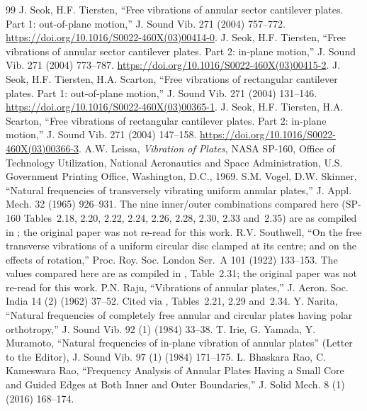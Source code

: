 \documentclass[11pt]{article}
\begin{document}
\begin{thebibliography}{99}\small
\setlength{\itemsep}{0pt}
\setlength{\parsep}{0pt}
 J. Seok, H.F. Tiersten, ``Free vibrations of annular sector
cantilever plates. Part 1: out-of-plane motion,'' J. Sound Vib. 271 (2004)
757--772. \url{https://doi.org/10.1016/S0022-460X(03)00414-0}.
 J. Seok, H.F. Tiersten, ``Free vibrations of annular sector
cantilever plates. Part 2: in-plane motion,'' J. Sound Vib. 271 (2004)
773--787. \url{https://doi.org/10.1016/S0022-460X(03)00415-2}.
 J. Seok, H.F. Tiersten, H.A. Scarton, ``Free vibrations of
rectangular cantilever plates. Part 1: out-of-plane motion,'' J. Sound
Vib. 271 (2004) 131--146. \url{https://doi.org/10.1016/S0022-460X(03)00365-1}.
 J. Seok, H.F. Tiersten, H.A. Scarton, ``Free vibrations of
rectangular cantilever plates. Part 2: in-plane motion,'' J. Sound Vib.
271 (2004) 147--158. \url{https://doi.org/10.1016/S0022-460X(03)00366-3}.
 A.W. Leissa, \emph{Vibration of Plates}, NASA SP-160,
Office of Technology Utilization, National Aeronautics and Space
Administration, U.S. Government Printing Office, Washington, D.C., 1969.
 S.M. Vogel, D.W. Skinner, ``Natural frequencies of
transversely vibrating uniform annular plates,'' J. Appl. Mech. 32 (1965)
926--931. The nine inner/outer combinations compared here (SP-160
Tables~2.18, 2.20, 2.22, 2.24, 2.26, 2.28, 2.30, 2.33 and~2.35) are as
compiled in \cite{leissaSP160}; the original paper was not re-read for
this work.
 R.V. Southwell, ``On the free transverse vibrations of a
uniform circular disc clamped at its centre; and on the effects of rotation,''
Proc. Roy. Soc. London Ser.~A 101 (1922) 133--153. The values compared here
are as compiled in \cite{leissaSP160}, Table~2.31; the original paper was not
re-read for this work.
 P.N. Raju, ``Vibrations of annular plates,'' J. Aeron. Soc.
India 14 (2) (1962) 37--52. Cited via \cite{leissaSP160}, Tables~2.21,
2.29 and~2.34.
 Y. Narita, ``Natural frequencies of completely free
annular and circular plates having polar orthotropy,'' J. Sound Vib. 92 (1)
(1984) 33--38.
 T. Irie, G. Yamada, Y. Muramoto, ``Natural frequencies of
in-plane vibration of annular plates'' (Letter to the Editor), J. Sound Vib.
97 (1) (1984) 171--175.
 L. Bhaskara Rao, C. Kameswara Rao, ``Frequency
Analysis of Annular Plates Having a Small Core and Guided Edges at Both
Inner and Outer Boundaries,'' J. Solid Mech. 8 (1) (2016) 168--174.

\end{thebibliography}
\end{document}
